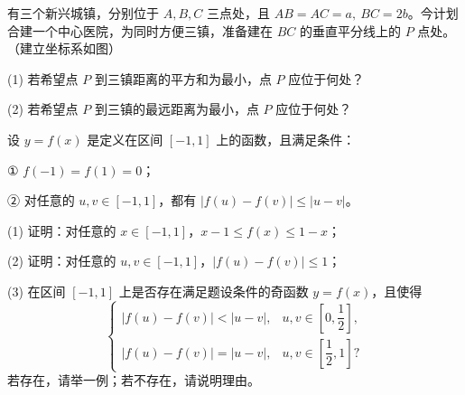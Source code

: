 \begin{question}
有三个新兴城镇，分别位于 \(A,B,C\) 三点处，且 \(AB=AC=a,\ BC=2b\)。今计划合建一个中心医院，为同时方便三镇，准备建在 \(BC\) 的垂直平分线上的 \(P\) 点处。（建立坐标系如图）

    (1) 若希望点 \(P\) 到三镇距离的平方和为最小，点 \(P\) 应位于何处？

    (2) 若希望点 \(P\) 到三镇的最远距离为最小，点 \(P\) 应位于何处？
\nopagebreak[4]
\begin{center}\end{center}
\nopagebreak[4]
\end{question}
\begin{question}
设 \(y=f(x)\) 是定义在区间 \([-1,1]\) 上的函数，且满足条件：

    ① \(f(-1)=f(1)=0\)；

    ② 对任意的 \(u,v\in[-1,1]\)，都有 \(|f(u)-f(v)|\le |u-v|\)。

    (1) 证明：对任意的 \(x\in[-1,1]\)，\(x-1\le f(x)\le 1-x\)；

    (2) 证明：对任意的 \(u,v\in[-1,1]\)，\(|f(u)-f(v)|\le 1\)；

    (3) 在区间 \([-1,1]\) 上是否存在满足题设条件的奇函数 \(y=f(x)\)，且使得
\nopagebreak[4]
\[
    \begin{cases}
    |f(u)-f(v)|<|u-v|,&u,v\in\left[0,\dfrac12\right],\\
    |f(u)-f(v)|=|u-v|,&u,v\in\left[\dfrac12,1\right]?
    \end{cases}
\]
    若存在，请举一例；若不存在，请说明理由。

\end{question}